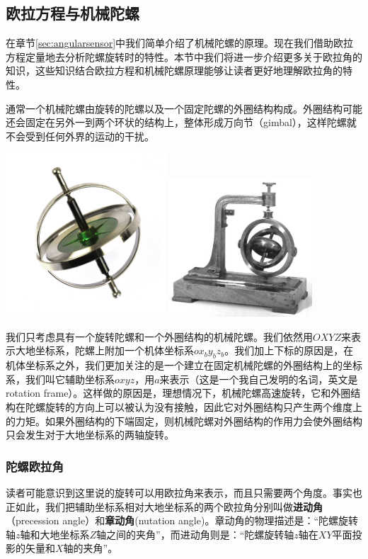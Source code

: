\documentclass[11pt]{article}
\begin{document}
\subsection{欧拉方程与机械陀螺}\label{sec:eulereqngyro}
在章节\ref{sec:angularsensor}中我们简单介绍了机械陀螺的原理。现在我们借助欧拉方程定量地去分析陀螺旋转时的特性。本节中我们将进一步介绍更多关于欧拉角的知识，这些知识结合欧拉方程和机械陀螺原理能够让读者更好地理解欧拉角的特性。

通常一个机械陀螺由旋转的陀螺以及一个固定陀螺的外圈结构构成。外圈结构可能还会固定在另外一到两个环状的结构上，整体形成万向节（gimbal），这样陀螺就不会受到任何外界的运动的干扰。

\includegraphics[width=0.45\textwidth]{images/gyro.jpg}
\includegraphics[width=0.4\textwidth]{images/gimbalgyro.jpg}

我们只考虑具有一个旋转陀螺和一个外圈结构的机械陀螺。我们依然用$OXYZ$来表示大地坐标系，陀螺上附加一个机体坐标系$ox_by_bz_b$。我们加上下标的原因是，在机体坐标系之外，我们更加关注的是一个建立在固定机械陀螺的外圈结构上的坐标系，我们叫它辅助坐标系$oxyz$，用$a$来表示（这是一个我自己发明的名词，英文是rotation frame）。这样做的原因是，理想情况下，机械陀螺高速旋转，它和外圈结构在陀螺旋转的方向上可以被认为没有接触，因此它对外圈结构只产生两个维度上的力矩。如果外圈结构的下端固定，则机械陀螺对外圈结构的作用力会使外圈结构只会发生对于大地坐标系的两轴旋转。
\subsubsection{陀螺欧拉角}
读者可能意识到这里说的旋转可以用欧拉角来表示，而且只需要两个角度。事实也正如此，我们把辅助坐标系相对大地坐标系的两个欧拉角分别叫做\textbf{进动角}（precession angle）和\textbf{章动角}(nutation angle)。章动角的物理描述是：“陀螺旋转轴$z$轴和大地坐标系$Z$轴之间的夹角”，而进动角则是：“陀螺旋转轴$z$轴在$XY$平面投影的矢量和$X$轴的夹角”。
\end{document}
